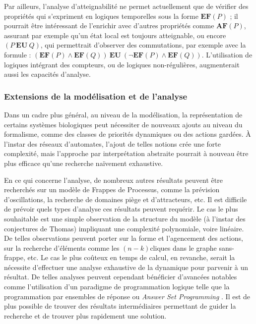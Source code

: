 Par ailleurs, l'analyse d'atteignabilité ne permet actuellement que de vérifier des propriétés
qui s'expriment en logiques temporelles sous la forme $\mathbf{EF}(P)$ ;
il pourrait être intéressant de l'enrichir avec d'autres propriétés comme
$\mathbf{AF}(P)$, assurant par exemple qu'un état local est toujours atteignable,
ou encore $(P\:\mathbf{EU}\:Q)$, qui permettrait d'observer des commutations,
par exemple avec la formule :
$(\mathbf{EF}(P) \wedge \mathbf{EF}(Q))\:\mathbf{EU}\:(\neg\mathbf{EF}(P) \wedge \mathbf{EF}(Q))$.
L'utilisation de logiques intégrant des compteurs,
ou de logiques non-régulières,
augmenterait aussi les capacités d'analyse.




\subsubsection*{Extensions de la modélisation et de l'analyse}

Dans un cadre plus général, au niveau de la modélisation,
la représentation de certains systèmes biologiques peut nécessiter de nouveaux ajouts au niveau du
formalisme,
comme des classes de priorités dynamiques ou des actions gardées.
À l'instar des réseaux d'automates, l'ajout de telles notions crée une forte complexité,
mais l'approche par interprétation abstraite pourrait à nouveau être plus efficace
qu'une recherche naïvement exhaustive.

En ce qui concerne l'analyse,
de nombreux autres résultats peuvent être recherchés sur un modèle de Frappes
de Processus, comme la prévision d'oscillations, la recherche
de domaines piège et d'attracteurs, etc.
Il est difficile de prévoir quels types d'analyse ces résultats peuvent requérir.
Le cas le plus souhaitable est une simple observation de la structure du modèle
(à l'instar des conjectures de Thomas) impliquant une complexité polynomiale, voire linéaire.
De telles observations peuvent porter sur la forme et l'agencement des actions,
sur la recherche d'éléments comme les $(n-k)$\nbd cliques dans le graphe sans-frappe,
etc.
Le cas le plus coûteux en temps de calcul, en revanche, serait la nécessite d'effectuer
une analyse exhaustive de la dynamique pour parvenir à un résultat.
De telles analyses peuvent cependant bénéficier d'avancées notables
comme l'utilisation d'un paradigme de programmation logique
telle que la programmation par ensembles de réponse ou \textit{Answer Set Programming}
.
Il est de plus possible de trouver des résultats intermédiaires
permettant de guider la recherche et de trouver plus rapidement une solution.



